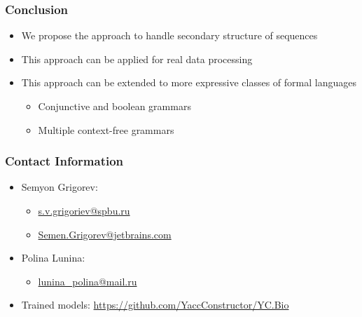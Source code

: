 \documentclass[xcolor=table]{beamer}
\begin{document}
\begin{frame} \frametitle{Conclusion}

\begin{itemize}
 \item We propose the approach to handle secondary structure of sequences
 \item This approach can be applied for real data processing
 \item This approach can be extended to more expressive classes of formal languages
 \begin{itemize}
   \item Conjunctive and boolean grammars
   \item Multiple context-free grammars
 \end{itemize}
\end{itemize}

\end{frame}


\begin{frame}
\frametitle{Contact Information}
\begin{itemize}
  \item Semyon Grigorev:
    \begin{itemize}
      \item \href{mailto:s.v.grigoriev@spbu.ru}{s.v.grigoriev@spbu.ru}
      \item \href{mailto:Semen.Grigorev@jetbrains.com}{Semen.Grigorev@jetbrains.com}
    \end{itemize}
  \item Polina Lunina:
  \begin{itemize}
    \item  \href{mailto:lunina_polina@mail.ru}{lunina\_polina@mail.ru}
  \end{itemize}
  \item Trained models: \href{https://github.com/YaccConstructor/YC.Bio}{https://github.com/YaccConstructor/YC.Bio}
\end{itemize}
\vspace{2cm}
\end{frame}
\end{document}
